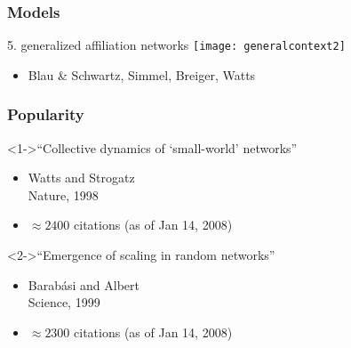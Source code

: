 \begin{frame}
  \frametitle{Models}

  \begin{block}{5. generalized affiliation networks}
    \texttt{[image: generalcontext2]}  
    \begin{itemize}
    \item Blau \& Schwartz\cite{blau1984a}, Simmel\cite{simmel1902a}, Breiger\cite{breiger1974a}, Watts \etal\cite{watts2002b}
    \end{itemize}
  \end{block}


\end{frame}


\begin{frame}
  \frametitle{Popularity}

  \begin{block}<1->{``Collective dynamics of `small-world' networks''\cite{watts1998a}}
    \begin{itemize}
    \item 
      Watts and Strogatz\\
      Nature, 1998
    \item 
      \alert{$\approx 2400$} citations {\tiny(as of Jan 14, 2008)}
    \end{itemize}
  \end{block}

  \begin{block}<2->{``Emergence of scaling in random networks''\cite{barabasi1999a}}
    \begin{itemize}
    \item 
      Barab\'{a}si and Albert\\
      Science, 1999
    \item 
      \alert{$\approx 2300$} citations {\tiny(as of Jan 14, 2008)}
    \end{itemize}
  \end{block}

\end{frame}
